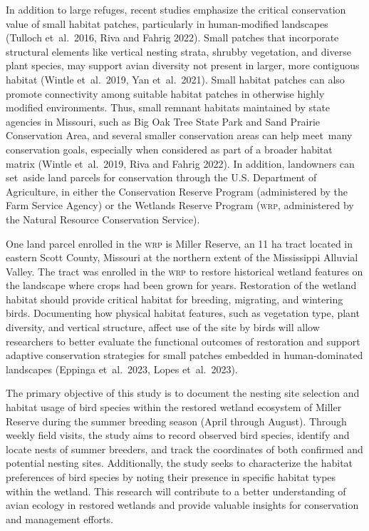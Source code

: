\documentclass[12pt]{article}
\begin{document}



In addition to large refuges, recent studies emphasize the critical conservation value of small habitat patches, particularly in human-modified landscapes (Tulloch et~al.~2016, Riva and Fahrig 2022). Small patches that incorporate structural elements like vertical nesting strata, shrubby vegetation, and diverse plant species, may support avian diversity not present in larger, more contiguous habitat (Wintle et~al.~2019, Yan et~al.~2021). Small habitat patches can also promote connectivity among suitable habitat patches in otherwise highly modified environments. Thus, small remnant habitats maintained by state agencies in Missouri, such as Big Oak Tree State Park and Sand Prairie Conservation Area, and several smaller conservation areas can help meet~many conservation goals, especially when considered as part of a broader habitat matrix (Wintle et~al.~2019, Riva and Fahrig 2022). In addition, landowners can set~aside land parcels for conservation through the U.S. Department of Agriculture, in either the Conservation Reserve Program (administered by the Farm Service Agency) or the Wetlands Reserve Program (\textsc{wrp}, administered by the Natural Resource Conservation Service). 


One land parcel enrolled in the \textsc{wrp} is Miller Reserve, an 11 ha tract located in eastern Scott County, Missouri at the northern extent of the Mississippi Alluvial Valley. The tract was enrolled in the \textsc{wrp} to restore historical wetland features on the landscape where crops had been grown for years. Restoration of the wetland habitat should  provide critical habitat for breeding, migrating, and wintering birds. Documenting how physical habitat features, such as vegetation type, plant diversity, and vertical structure, affect use of the site by birds will allow researchers to better evaluate the functional outcomes of restoration and support adaptive conservation strategies for small patches embedded in human-dominated landscapes (Eppinga et~al.~2023, Lopes et~al.~2023).

The primary objective of this study is to document the nesting site selection and habitat usage of bird species within the restored wetland ecosystem of Miller Reserve during the summer breeding season (April through August). Through weekly field visits, the study aims to record observed bird species, identify and locate nests of summer breeders, and track the coordinates of both confirmed and potential nesting sites. Additionally, the study seeks to characterize the habitat preferences of bird species by noting their presence in specific habitat types within the wetland. This research will contribute to a better understanding of avian ecology in restored wetlands and provide valuable insights for conservation and management efforts.
\end{document}
